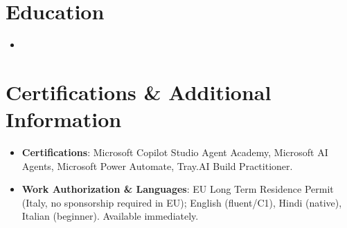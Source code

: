 \documentclass[10pt,a4paper,sans]{moderncv}
\begin{document}
\section{Education}
\vspace{1pt}
\begin{itemize}
\item{}
\end{itemize}
\vspace{3pt}

\section{Certifications \& Additional Information}
\vspace{1pt}
\begin{itemize}
\item \textbf{Certifications}: Microsoft Copilot Studio Agent Academy, Microsoft AI Agents, Microsoft Power Automate, Tray.AI Build Practitioner.
\item \textbf{Work Authorization \& Languages}: EU Long Term Residence Permit (Italy, no sponsorship required in EU); English (fluent/C1), Hindi (native), Italian (beginner). Available immediately.
\end{itemize}
\end{document}
